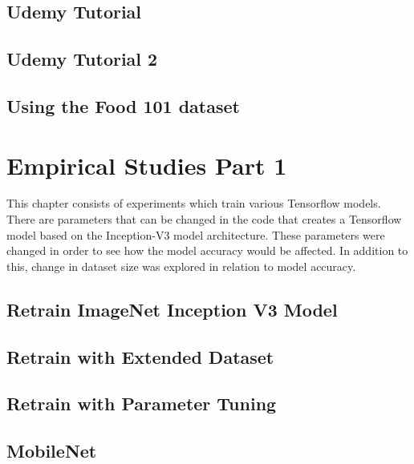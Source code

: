 \section{Udemy Tutorial}
\label{udemy1}


\section{Udemy Tutorial 2}
\label{udemy2}


\section{Using the Food 101 dataset}
\label{food101}


\chapter{Empirical Studies Part 1}
This chapter consists of experiments which train various Tensorflow models.
There are parameters that can be changed in the code that creates a Tensorflow model based on the Inception-V3 model architecture.
These parameters were changed in order to see how the model accuracy would be affected.
In addition to this, change in dataset size was explored in relation to model accuracy.


\section{Retrain ImageNet Inception V3 Model}
\label{inception}


\section{Retrain with Extended Dataset}
\label{extended}


\section{Retrain with Parameter Tuning}
\label{parameterTuning}


\section{MobileNet}
\label{mobilenet}


